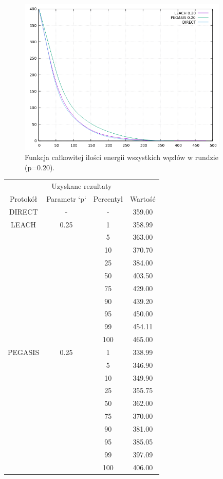 \documentclass[a4paper,12pt,twoside,openany]{report}
\begin{document}
\begin{figure}[H]
 \centering
 \includegraphics[width=10cm]{images/gnuplot/test_4/energy_in_round_p020.png}
 \caption{Funkcja całkowitej ilości energii wszystkich węzłów w rundzie (p=0.20).}
\end{figure}

\begin{longtable}{*{4}{c}}
\toprule
\multicolumn{4}{c}{Uzyskane rezultaty} \\
Protokół	& Parametr `p`	& Percentyl	& Wartość \\
\midrule
\endhead
DIRECT	& - 	& -	& 359.00 \\*
\midrule
LEACH	& 0.25	& 1	& 358.99 \\*
	&	& 5	& 363.00 \\*
	&	& 10	& 370.70 \\*
	&	& 25	& 384.00 \\*
	&	& 50	& 403.50 \\*
	&	& 75	& 429.00 \\*
	&	& 90	& 439.20 \\*
	&	& 95	& 450.00 \\*
	&	& 99	& 454.11 \\*
	&	& 100	& 465.00 \\*
\midrule
PEGASIS	& 0.25	& 1	& 338.99 \\*
	&	& 5	& 346.90 \\*
	&	& 10	& 349.90 \\*
	&	& 25	& 355.75 \\*
	&	& 50	& 362.00 \\*
	&	& 75	& 370.00 \\*
	&	& 90	& 381.00 \\*
	&	& 95	& 385.05 \\*
	&	& 99	& 397.09 \\*
	&	& 100	& 406.00 \\*
\bottomrule
\end{longtable}
\end{document}
